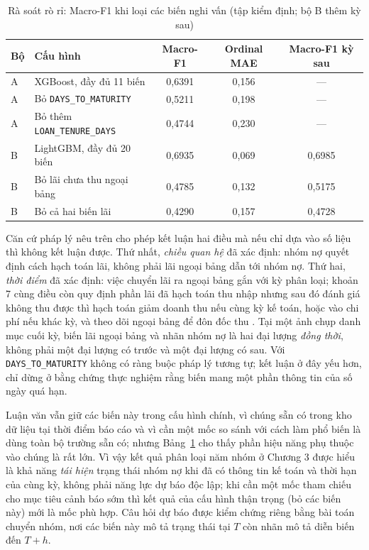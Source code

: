 \begin{table}[H]
\centering
\caption{Rà soát rò rỉ: Macro-F1 khi loại các biến nghi vấn (tập kiểm định; bộ B thêm kỳ sau)}
\label{tab:leakage-review}
\begin{tabular}{|l|l|c|c|c|}
\hline
Bộ & Cấu hình & Macro-F1 & Ordinal MAE & Macro-F1 kỳ sau\\
\hline
A & XGBoost, đầy đủ 11 biến & 0,6391 & 0,156 & ---\\
A & Bỏ \mbox{\texttt{DAYS\_TO\_MATURITY}} & 0,5211 & 0,198 & ---\\
A & Bỏ thêm \mbox{\texttt{LOAN\_TENURE\_DAYS}} & 0,4744 & 0,230 & ---\\
\hline
B & LightGBM, đầy đủ 20 biến & 0,6935 & 0,069 & 0,6985\\
B & Bỏ lãi chưa thu ngoại bảng & 0,4785 & 0,132 & 0,5175\\
B & Bỏ cả hai biến lãi & 0,4290 & 0,157 & 0,4728\\
\hline
\end{tabular}
\end{table}

Căn cứ pháp lý nêu trên cho phép kết luận hai điều mà nếu chỉ dựa vào số liệu thì không kết luận được. Thứ nhất, \emph{chiều quan hệ} đã xác định: nhóm nợ quyết định cách hạch toán lãi, không phải lãi ngoại bảng dẫn tới nhóm nợ. Thứ hai, \emph{thời điểm} đã xác định: việc chuyển lãi ra ngoại bảng gắn với kỳ phân loại; khoản 7 cùng điều còn quy định phần lãi đã hạch toán thu nhập nhưng sau đó đánh giá không thu được thì hạch toán giảm doanh thu nếu cùng kỳ kế toán, hoặc vào chi phí nếu khác kỳ, và theo dõi ngoại bảng để đôn đốc thu \cite{btc2018tt16}. Tại một ảnh chụp danh mục cuối kỳ, biến lãi ngoại bảng và nhãn nhóm nợ là hai đại lượng \emph{đồng thời}, không phải một đại lượng có trước và một đại lượng có sau. Với \mbox{\texttt{DAYS\_TO\_MATURITY}} không có ràng buộc pháp lý tương tự; kết luận ở đây yếu hơn, chỉ dừng ở bằng chứng thực nghiệm rằng biến mang một phần thông tin của số ngày quá hạn.

Luận văn vẫn giữ các biến này trong cấu hình chính, vì chúng sẵn có trong kho dữ liệu tại thời điểm báo cáo và vì cần một mốc so sánh với cách làm phổ biến là dùng toàn bộ trường sẵn có; nhưng Bảng~\ref{tab:leakage-review} cho thấy phần hiệu năng phụ thuộc vào chúng là rất lớn. Vì vậy kết quả phân loại năm nhóm ở Chương 3 được hiểu là khả năng \emph{tái hiện} trạng thái nhóm nợ khi đã có thông tin kế toán và thời hạn của cùng kỳ, không phải năng lực dự báo độc lập; khi cần một mốc tham chiếu cho mục tiêu cảnh báo sớm thì kết quả của cấu hình thận trọng (bỏ các biến này) mới là mốc phù hợp. Câu hỏi dự báo được kiểm chứng riêng bằng bài toán chuyển nhóm, nơi các biến này mô tả trạng thái tại $T$ còn nhãn mô tả diễn biến đến $T+h$.

